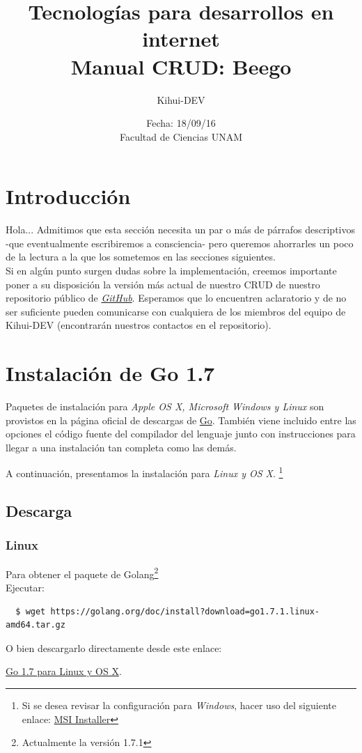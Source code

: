 \documentclass[12pt]{article}
\title{Tecnologías para desarrollos en internet \\ Manual CRUD: Beego}
\author{Kihui-DEV}
\date{Fecha: 18/09/16 \\ Facultad de Ciencias UNAM}
\begin{document}
\maketitle
\tableofcontents{}
\newpage

\section{Introducción}
Hola... Admitimos que esta sección necesita un par o más de párrafos descriptivos -que eventualmente
escribiremos a consciencia- pero queremos ahorrarles un poco de la lectura a la que los sometemos
en las secciones siguientes. \\
Si en algún punto surgen dudas sobre la implementación, creemos importante poner a su disposición la versión
más actual de nuestro CRUD  de nuestro
repositorio público de \href{https://github.com/Kihui/Beego-CRUD}{\textit{GitHub}}.
Esperamos que lo encuentren aclaratorio y de no ser suficiente pueden comunicarse con cualquiera de los
miembros del equipo de Kihui-DEV (encontrarán nuestros contactos en el repositorio). 
\newpage
\section{Instalación de Go 1.7}
Paquetes de instalación para \textit{Apple OS X, Microsoft Windows y Linux} son provistos en la página oficial de descargas de \href{https://golang.org/dl/}{Go}. También viene incluido entre las opciones el código fuente del compilador del lenguaje junto con instrucciones para llegar a una instalación tan completa como las demás. \par
A continuación, presentamos la instalación para \textit{Linux y OS X}. \footnote{Si se desea revisar la configuración para \textit{Windows}, hacer uso del siguiente enlace:
  \href{https://golang.org/doc/install?download=go1.7.1.windows-amd64.msi}{MSI Installer}}

\subsection{Descarga}\label{sec:d}


\subsubsection*{Linux}
Para obtener el paquete de Golang\footnote{Actualmente la versión 1.7.1} \\
Ejecutar:
\begin{verbatim}
  $ wget https://golang.org/doc/install?download=go1.7.1.linux-amd64.tar.gz
\end{verbatim}
O bien descargarlo directamente desde este enlace:
\begin{center}
\href{https://golang.org/doc/install?download=go1.7.1.linux-amd64.tar.gz}{Go 1.7 para Linux y OS X}.
\end{center}
\end{document}
